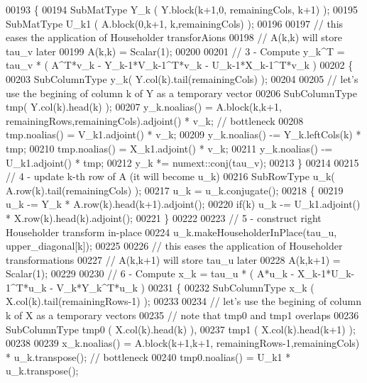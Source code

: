 \begin{DoxyCode}
00193     \{
00194       SubMatType Y\_k  ( Y.block(k+1,0, remainingCols, k+1) );
00195       SubMatType U\_k1 ( A.block(0,k+1, k,remainingCols) );
00196       
00197       \textcolor{comment}{// this eases the application of Householder transforAions}
00198       \textcolor{comment}{// A(k,k) will store tau\_v later}
00199       A(k,k) = Scalar(1);
00200 
00201       \textcolor{comment}{// 3 - Compute y\_k^T = tau\_v * ( A^T*v\_k - Y\_k-1*V\_k-1^T*v\_k - U\_k-1*X\_k-1^T*v\_k )}
00202       \{
00203         SubColumnType y\_k( Y.col(k).tail(remainingCols) );
00204         
00205         \textcolor{comment}{// let's use the begining of column k of Y as a temporary vector}
00206         SubColumnType tmp( Y.col(k).head(k) );
00207         y\_k.noalias()  = A.block(k,k+1, remainingRows,remainingCols).adjoint() * v\_k; \textcolor{comment}{// bottleneck}
00208         tmp.noalias()  = V\_k1.adjoint()  * v\_k;
00209         y\_k.noalias() -= Y\_k.leftCols(k) * tmp;
00210         tmp.noalias()  = X\_k1.adjoint()  * v\_k;
00211         y\_k.noalias() -= U\_k1.adjoint()  * tmp;
00212         y\_k *= numext::conj(tau\_v);
00213       \}
00214 
00215       \textcolor{comment}{// 4 - update k-th row of A (it will become u\_k)}
00216       SubRowType u\_k( A.row(k).tail(remainingCols) );
00217       u\_k = u\_k.conjugate();
00218       \{
00219         u\_k -= Y\_k * A.row(k).head(k+1).adjoint();
00220         \textcolor{keywordflow}{if}(k) u\_k -= U\_k1.adjoint() * X.row(k).head(k).adjoint();
00221       \}
00222 
00223       \textcolor{comment}{// 5 - construct right Householder transform in-place}
00224       u\_k.makeHouseholderInPlace(tau\_u, upper\_diagonal[k]);
00225 
00226       \textcolor{comment}{// this eases the application of Householder transformations}
00227       \textcolor{comment}{// A(k,k+1) will store tau\_u later}
00228       A(k,k+1) = Scalar(1);
00229 
00230       \textcolor{comment}{// 6 - Compute x\_k = tau\_u * ( A*u\_k - X\_k-1*U\_k-1^T*u\_k - V\_k*Y\_k^T*u\_k )}
00231       \{
00232         SubColumnType x\_k ( X.col(k).tail(remainingRows-1) );
00233         
00234         \textcolor{comment}{// let's use the begining of column k of X as a temporary vectors}
00235         \textcolor{comment}{// note that tmp0 and tmp1 overlaps}
00236         SubColumnType tmp0 ( X.col(k).head(k) ),
00237                       tmp1 ( X.col(k).head(k+1) );
00238                     
00239         x\_k.noalias()   = A.block(k+1,k+1, remainingRows-1,remainingCols) * u\_k.transpose(); \textcolor{comment}{// bottleneck}
00240         tmp0.noalias()  = U\_k1 * u\_k.transpose();

\end{DoxyCode}
